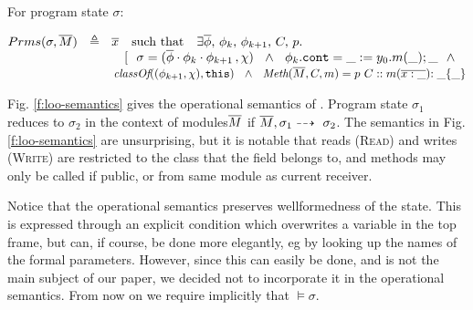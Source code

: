 \begin{definition}
For program state $\sigma$:
\label{def:params}

$\Formals \sigma \Mtwo \ \ \triangleq \ \  \overline x \ \ \ \mbox{such that} \ \  \  \exists \overline {\phi},\,\phi_k, \, \phi_{k+1}, \,C,\,p.$\\
$\strut \hspace{3.2cm} [   \ \ \sigma =  (\overline {\phi}\cdot{\phi_k}\cdot{\phi_{k+1}}\,, \chi) 
\  \ \wedge\  \ \phi_k.\prg{cont}=\_:=y_0.m(\_); \_ \  \  \wedge\ \ $\\
$\strut \hspace{3.2cm} \class{(\phi_{k+1},\chi)}  {\prg{this} }\  \ \wedge\ \ \meth{\Mtwo} {C} {m} = p \ C::m(\overline{x : \_}){:\_}\{\_\}  $
\end{definition}






Fig. \ref{f:loo-semantics} gives the operational semantics of \LangOO. 
Program state $\sigma_1$ reduces to $\sigma_2$ in the context of
modules$\overline{M}$ if $\overline{M}, \sigma_1 \dashrightarrow\ \sigma_2$. The semantics in Fig. \ref{f:loo-semantics}
are unsurprising, but it is notable that reads (\textsc{Read}) and writes (\textsc{Write})
are restricted to the class that the field belongs to,
{and methods  may only be called if public, or from same module as current receiver.}

Notice that the operational semantics preserves wellformedness of the state.
This is expressed through an explicit condition which overwrites a variable in the top frame, but can, if course, be done more elegantly, eg by looking up the names of the formal parameters. However, since this can easily be done, and is not the main subject of our paper, we decided not to incorporate it in the operational semantics.
From now on we require implicitly that $\models \sigma$.

